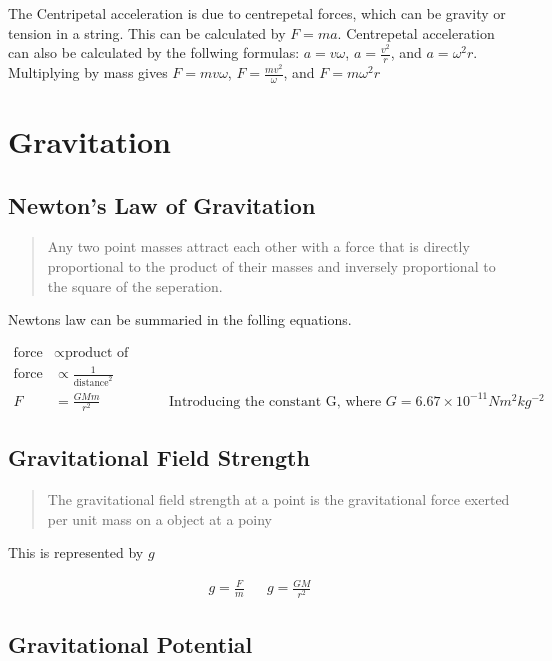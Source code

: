 \documentclass{scrbook}
\begin{document}
	The Centripetal acceleration is due to centrepetal forces, which can be gravity or tension in a string. This can be calculated by $F = ma$. Centrepetal acceleration can also be calculated by the follwing formulas: $a = v\omega$, $a = \frac{v^2}{r}$, and $a = \omega ^2 r$. Multiplying by mass gives $F = mv\omega$, $F = \frac{mv^2}{\omega}$, and $F = m\omega^2r$

\section{Gravitation}

\subsection{Newton's Law of Gravitation}

	\begin{quote}
		Any two point masses attract each other with a force that is directly proportional to the product of their masses and inversely proportional to the square of the seperation.
	\end{quote}

	Newtons law can be summaried in the folling equations.
	
	\begin{align*}
	\text{force} &\propto \text{product  of  masses} &
		\\
		\text{force} &\propto \frac{1}{\text{distance}^2} &
		\\
		F &= \frac{GMm}{r^2} & \text{Introducing the constant G, where } G = 6.67\times 10^{-11} Nm^2kg^{-2}
	\end{align*}

\subsection{Gravitational Field Strength}

	\begin{quote}
		The gravitational field strength at a point is the gravitational force exerted per unit mass on a object at a poiny
	\end{quote}

	This is represented by $g$

	\begin{align*}g = \frac{F}{m} & & g = \frac{GM}{r^2}\end{align*}
	
\subsection{Gravitational Potential}
\end{document}
